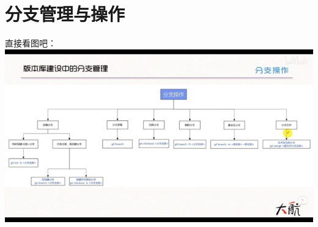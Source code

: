\documentclass{article}
\begin{document}
\section{分支管理与操作}
直接看图吧：
\includegraphics{image/11.1.jpg}
\end{document}
